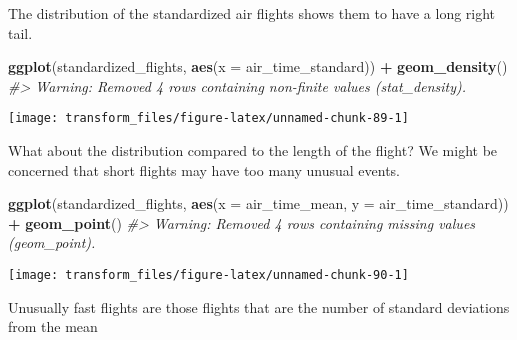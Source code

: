 \documentclass[]{book}
\newenvironment{Shaded}{\begin{snugshade}}{\end{snugshade}}
\newcommand{\CommentTok}[1]{\textcolor[rgb]{0.56,0.35,0.01}{\textit{#1}}}
\newcommand{\DataTypeTok}[1]{\textcolor[rgb]{0.13,0.29,0.53}{#1}}
\newcommand{\KeywordTok}[1]{\textcolor[rgb]{0.13,0.29,0.53}{\textbf{#1}}}
\newcommand{\NormalTok}[1]{#1}
\newcommand{\OperatorTok}[1]{\textcolor[rgb]{0.81,0.36,0.00}{\textbf{#1}}}
\newcommand{\StringTok}[1]{\textcolor[rgb]{0.31,0.60,0.02}{#1}}
\theoremstyle{plain}
\theoremstyle{remark}
\begin{document}
The distribution of the standardized air flights shows them to have a
long right tail.

\begin{Shaded}
\begin{Highlighting}[]
\KeywordTok{ggplot}\NormalTok{(standardized_flights, }\KeywordTok{aes}\NormalTok{(}\DataTypeTok{x =}\NormalTok{ air_time_standard)) }\OperatorTok{+}
\StringTok{  }\KeywordTok{geom_density}\NormalTok{()}
\CommentTok{#> Warning: Removed 4 rows containing non-finite values (stat_density).}
\end{Highlighting}
\end{Shaded}

\begin{center}\texttt{[image: transform\_files/figure-latex/unnamed-chunk-89-1]} \end{center}

What about the distribution compared to the length of the flight? We
might be concerned that short flights may have too many unusual events.

\begin{Shaded}
\begin{Highlighting}[]
\KeywordTok{ggplot}\NormalTok{(standardized_flights, }\KeywordTok{aes}\NormalTok{(}\DataTypeTok{x =}\NormalTok{ air_time_mean, }\DataTypeTok{y =}\NormalTok{ air_time_standard)) }\OperatorTok{+}
\StringTok{  }\KeywordTok{geom_point}\NormalTok{()}
\CommentTok{#> Warning: Removed 4 rows containing missing values (geom_point).}
\end{Highlighting}
\end{Shaded}

\begin{center}\texttt{[image: transform\_files/figure-latex/unnamed-chunk-90-1]} \end{center}

Unusually fast flights are those flights that are the number of standard
deviations from the mean
\end{document}
